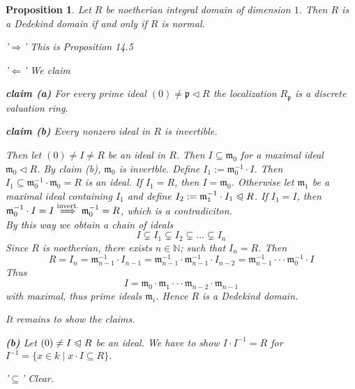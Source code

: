 \documentclass[11pt]{book}
\newtheorem{proposition}[theorem]{Proposition}
\theoremstyle{nonumberbreak}
\newenvironment{pr}[1][]{\ifthenelse{\equal{#1}{}}{\proof}{\proof[#1]}\rm}{\endproof}
\begin{document}
\begin{spacing}{1.3}
\begin{proposition} %
Let $R$ be noetherian integral domain of dimension $1$.
Then $R$ is a Dedekind domain if and only if $R$ is normal.
\begin{pr}
\begin{compactitem}
\item['$\Rightarrow$'] This is Proposition 14.5
\item['$\Leftarrow$'] We claim
\begin{compactenum}
\item[\textbf{claim (a)}] For every prime ideal $( 0 ) \neq \mathfrak{p} \triangleleft R$ the localization $R_{\mathfrak{p}}$ is a discrete valuation ring.
\item[\textbf{claim (b)}] Every nonzero ideal in $R$ is invertible.
\end{compactenum}
Then let $( 0 ) \neq I \neq R$ be an ideal in $R$.
Then $I \subseteq \mathfrak{m}_0$ for a maximal ideal $\mathfrak{m}_0 \triangleleft R$. By claim (b), $\mathfrak{m}_0$ is invertble. Define $I_1 := \mathfrak{m}_0^{-1} \cdot I$.
Then $I_1 \subseteq \mathfrak{m}_0^{-1} \cdot \mathfrak{m}_0 = R$ is an ideal.
If $I_1=R$, then $I=\mathfrak{m}_0$. Otherwise let $\mathfrak{m}_1$ be a maximal ideal containing $I_1$ and define $I_2:=\mathfrak{m}_1^{-1}\cdot I_1 \trianglelefteqslant R$.
If $I_1=I$, then $\mathfrak{m}_0^{-1} \cdot I=I \overset{\rm{invert.}}{\Longrightarrow} \mathfrak{m}_0^{-1}=R$, which is a contradiciton.\\
By this way we obtain a chain of ideals
$$I \subsetneq I_1 \subsetneq I_2 \subsetneq \ldots \subsetneq I_n$$
Since $R$ is noetherian, there exists $n \in \mathbb{N}$; such that $I_n=R$. 
Then $$R=I_n=\mathfrak{m}_{n-1}^{-1} \cdot I_{n-1}=\mathfrak{m}_{n-1}^{-1} \cdot \mathfrak{m}_{n-1}^{-1} \cdot I_{n-2} = \mathfrak{m}_{n-1}^{-1} \cdot \cdot \cdot \mathfrak{m}_0^{-1} \cdot I$$
Thus
$$I=\mathfrak{m}_0 \cdot \mathfrak{m}_1 \cdot \cdot \cdot \mathfrak{m}_{n-2} \cdot \mathfrak{m}_{n-1}$$
with maximal, thus prime ideals $\mathfrak{m}_i$. Hence $R$ is a Dedekind domain.
\end{compactitem}
It remains to show the claims.
\begin{compactenum}
\item[\textbf{(b)}] Let $( 0 ) \neq I \trianglelefteqslant R$ be an ideal. We have to show
$I \cdot I^{-1}=R$ for $I^{-1}=\{x \in k \mid x \cdot I \subseteq R\}.$
\begin{compactitem}
\item['$\subseteq$'] Clear.

\end{compactitem}
\end{compactenum}
\end{pr}
\end{proposition}
\end{spacing}
\end{document}
